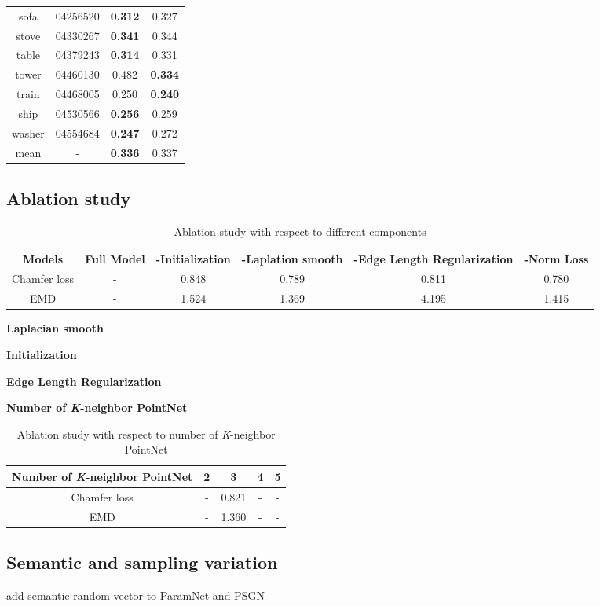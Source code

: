\begin{table}
\begin{tabular}{c c c c}
		sofa & 04256520 & {\color{blue}\textbf{0.312}} & 0.327\\
		stove & 04330267 & {\color{blue}\textbf{0.341}} & 0.344\\
		table & 04379243 & {\color{blue}\textbf{0.314}} & 0.331\\
		tower & 04460130 & 0.482 & {\color{blue}\textbf{0.334}}\\
		train & 04468005 & 0.250 & {\color{blue}\textbf{0.240}}\\
		ship  & 04530566 & {\color{blue}\textbf{0.256}} & 0.259\\
		washer &  04554684 & {\color{blue}\textbf{0.247}} & 0.272\\
		mean   &     -     & {\color{blue}\textbf{0.336}} & 0.337
	\end{tabular}
\end{table}

\subsection{Ablation study}
\begin{table*}
	\caption{Ablation study with respect to different components}
	\label{tab:ablation}
	\centering
	\begin{tabular}{c | c c c c c}
		Models &  Full Model  & -Initialization & -Laplation smooth & -Edge Length Regularization & -Norm Loss \\
		\hline
		Chamfer loss & - & 0.848 & 0.789 & 0.811  & 0.780\\
		EMD			 & - & 1.524 & 1.369 & 4.195  & 1.415
	\end{tabular}
\end{table*}
\noindent\textbf{Laplacian smooth}

\noindent\textbf{Initialization}

\noindent\textbf{Edge Length Regularization}

\noindent\textbf{Number of \textit{K}-neighbor PointNet}
\begin{table*}
	\caption{Ablation study with respect to number of \textit{K}-neighbor PointNet}
	\label{tab:pointnet}
	\centering
	\begin{tabular}{c | c c c c}
		Number of \textit{K}-neighbor PointNet &  2 & 3 & 4 & 5 \\
		\hline
		Chamfer loss & - &  0.821 & - & - \\
		EMD			&  - & 1.360 & - & -
	\end{tabular}
\end{table*}
\subsection{Semantic and sampling variation}
add semantic random vector to ParamNet and PSGN\cite{PSGN}
